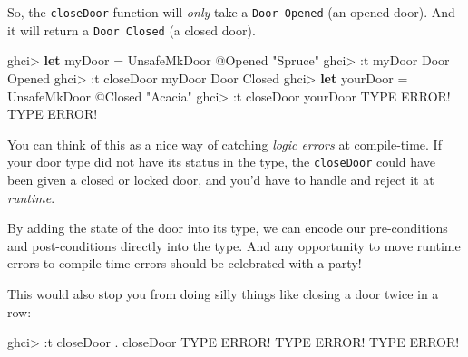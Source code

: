 \documentclass[]{article}
\newenvironment{Shaded}{}{}
\newcommand{\DataTypeTok}[1]{\textcolor[rgb]{0.56,0.13,0.00}{#1}}
\newcommand{\KeywordTok}[1]{\textcolor[rgb]{0.00,0.44,0.13}{\textbf{#1}}}
\newcommand{\NormalTok}[1]{#1}
\newcommand{\OperatorTok}[1]{\textcolor[rgb]{0.40,0.40,0.40}{#1}}
\newcommand{\OtherTok}[1]{\textcolor[rgb]{0.00,0.44,0.13}{#1}}
\newcommand{\StringTok}[1]{\textcolor[rgb]{0.25,0.44,0.63}{#1}}
\begin{document}
So, the \texttt{closeDoor} function will \emph{only} take a
\texttt{Door\ \textquotesingle{}Opened} (an opened door). And it will return a
\texttt{Door\ \textquotesingle{}Closed} (a closed door).

\begin{Shaded}
\begin{Highlighting}[]
\NormalTok{ghci}\OperatorTok{\textgreater{}} \KeywordTok{let}\NormalTok{ myDoor }\OtherTok{=} \DataTypeTok{UnsafeMkDoor} \OperatorTok{@}\DataTypeTok{\textquotesingle{}Opened} \StringTok{"Spruce"}
\NormalTok{ghci}\OperatorTok{\textgreater{}} \OperatorTok{:}\NormalTok{t myDoor}
\DataTypeTok{Door} \DataTypeTok{\textquotesingle{}Opened}
\NormalTok{ghci}\OperatorTok{\textgreater{}} \OperatorTok{:}\NormalTok{t closeDoor myDoor}
\DataTypeTok{Door} \DataTypeTok{\textquotesingle{}Closed}
\NormalTok{ghci}\OperatorTok{\textgreater{}} \KeywordTok{let}\NormalTok{ yourDoor }\OtherTok{=} \DataTypeTok{UnsafeMkDoor} \OperatorTok{@}\DataTypeTok{\textquotesingle{}Closed} \StringTok{"Acacia"}
\NormalTok{ghci}\OperatorTok{\textgreater{}} \OperatorTok{:}\NormalTok{t closeDoor yourDoor}
\DataTypeTok{TYPE} \DataTypeTok{ERROR}\OperatorTok{!}  \DataTypeTok{TYPE} \DataTypeTok{ERROR}\OperatorTok{!}
\end{Highlighting}
\end{Shaded}

You can think of this as a nice way of catching \emph{logic errors} at
compile-time. If your door type did not have its status in the type, the
\texttt{closeDoor} could have been given a closed or locked door, and you'd have
to handle and reject it at \emph{runtime}.

By adding the state of the door into its type, we can encode our pre-conditions
and post-conditions directly into the type. And any opportunity to move runtime
errors to compile-time errors should be celebrated with a party!

This would also stop you from doing silly things like closing a door twice in a
row:

\begin{Shaded}
\begin{Highlighting}[]
\NormalTok{ghci}\OperatorTok{\textgreater{}} \OperatorTok{:}\NormalTok{t closeDoor }\OperatorTok{.}\NormalTok{ closeDoor}
\DataTypeTok{TYPE} \DataTypeTok{ERROR}\OperatorTok{!}  \DataTypeTok{TYPE} \DataTypeTok{ERROR}\OperatorTok{!}  \DataTypeTok{TYPE} \DataTypeTok{ERROR}\OperatorTok{!}
\end{Highlighting}
\end{Shaded}
\end{document}
